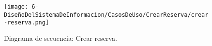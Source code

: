 \begin{figure}[H]
	\centering
	\begin{adjustwidth}{-0.7cm}{}
		\texttt{[image: 6-DiseñoDelSistemaDeInformacion/CasosDeUso/CrearReserva/crear-reserva.png]}
	\end{adjustwidth}
	\caption{Diagrama de secuencia: Crear reserva.}
\end{figure}

